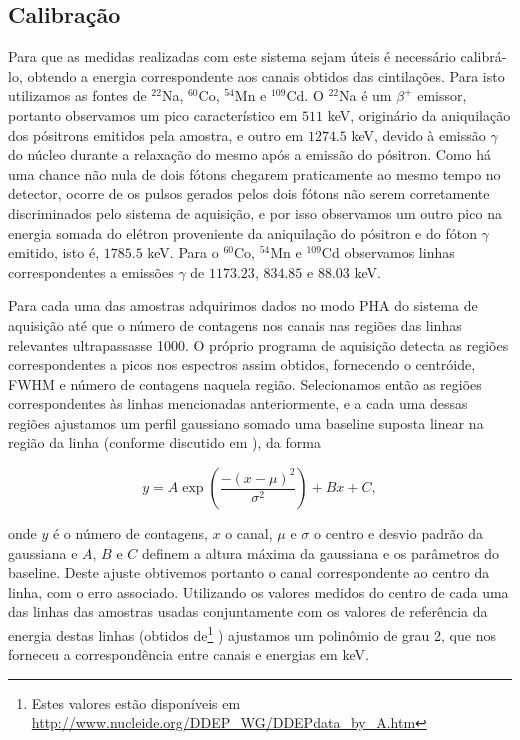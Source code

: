 \documentclass[a4paper, 11pt, notitlepage]{article}
\numberwithin{equation}{section}  %
\begin{document}
\subsection{Calibração}

Para que as medidas realizadas com este sistema sejam úteis é necessário calibrá-lo, obtendo a energia correspondente aos canais obtidos das cintilações. Para isto utilizamos as fontes de ${}^{22}$Na, ${}^{60}$Co, ${}^{54}$Mn e ${}^{109}$Cd. O ${}^{22}$Na é um $\beta^+$ emissor, portanto observamos um pico característico em $511$ keV, originário da aniquilação dos pósitrons emitidos pela amostra, e outro em $1274.5$ keV, devido à emissão $\gamma$ do núcleo durante a relaxação do mesmo após a emissão do pósitron. Como há uma chance não nula de dois fótons chegarem praticamente ao mesmo tempo no detector, ocorre de os pulsos gerados pelos dois fótons não serem corretamente discriminados pelo sistema de aquisição, e por isso observamos um outro pico na energia somada do elétron proveniente da aniquilação do pósitron e do fóton $\gamma$ emitido, isto é, $1785.5$ keV. Para o ${}^{60}$Co, ${}^{54}$Mn e ${}^{109}$Cd observamos linhas correspondentes a emissões $\gamma$ de $1173.23$, $834.85$ e $88.03$ keV.

Para cada uma das amostras adquirimos dados no modo PHA do sistema de aquisição até que o número de contagens nos canais nas regiões das linhas relevantes ultrapassasse 1000. O próprio programa de aquisição detecta as regiões correspondentes a picos nos espectros assim obtidos, fornecendo o centróide, FWHM e número de contagens naquela região. Selecionamos então as regiões correspondentes às linhas mencionadas anteriormente, e a cada uma dessas regiões ajustamos um perfil gaussiano somado uma baseline suposta linear na região da linha (conforme discutido em \cite{curry1995}), da forma

\begin{equation*}
  y = A \exp\left(\frac{-(x - \mu)^2}{\sigma^2} \right) + Bx + C,
\end{equation*}

\noindent onde $y$ é o número de contagens, $x$ o canal, $\mu$ e $\sigma$ o centro e desvio padrão da gaussiana e $A$, $B$ e $C$ definem a altura máxima da gaussiana e os parâmetros do baseline. Deste ajuste obtivemos portanto o canal correspondente ao centro da linha, com o erro associado. Utilizando os valores medidos do centro de cada uma das linhas das amostras usadas conjuntamente com os valores de referência da energia destas linhas (obtidos de\footnote{Estes valores estão disponíveis em \url{http://www.nucleide.org/DDEP_WG/DDEPdata_by_A.htm}} \cite{TabRad_v1,TabRad_v3,TabRad_v5,TabRad_v8}) ajustamos um polinômio de grau 2, que nos forneceu a correspondência entre canais e energias em keV.
\end{document}
